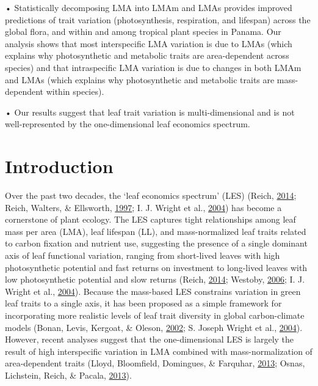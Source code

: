 \documentclass[12pt,]{article}
\theoremstyle{definition}
\theoremstyle{definition}
\theoremstyle{definition}
\theoremstyle{remark}
\begin{document}
• Statistically decomposing LMA into LMAm and LMAs provides improved
predictions of trait variation (photosynthesis, respiration, and
lifespan) across the global flora, and within and among tropical plant
species in Panama. Our analysis shows that most interspecific LMA
variation is due to LMAs (which explains why photosynthetic and
metabolic traits are area-dependent across species) and that
intraspecific LMA variation is due to changes in both LMAm and LMAs
(which explains why photosynthetic and metabolic traits are
mass-dependent within species).

• Our results suggest that leaf trait variation is multi-dimensional and
is not well-represented by the one-dimensional leaf economics spectrum.

\hypertarget{introduction}{%
\section{Introduction}\label{introduction}}

Over the past two decades, the `leaf economics spectrum' (LES) (Reich,
\protect\hyperlink{ref-Reich2014}{2014}; Reich, Walters, \& Ellsworth,
\protect\hyperlink{ref-Reich1997}{1997}; I. J. Wright et al.,
\protect\hyperlink{ref-Wright2004a}{2004}) has become a cornerstone of
plant ecology. The LES captures tight relationships among leaf mass per
area (LMA), leaf lifespan (LL), and mass-normalized leaf traits related
to carbon fixation and nutrient use, suggesting the presence of a single
dominant axis of leaf functional variation, ranging from short-lived
leaves with high photosynthetic potential and fast returns on investment
to long-lived leaves with low photosynthetic potential and slow returns
(Reich, \protect\hyperlink{ref-Reich2014}{2014}; Westoby,
\protect\hyperlink{ref-Westoby2006}{2006}; I. J. Wright et al.,
\protect\hyperlink{ref-Wright2004a}{2004}). Because the mass-based LES
constrains variation in green leaf traits to a single axis, it has been
proposed as a simple framework for incorporating more realistic levels
of leaf trait diversity in global carbon-climate models (Bonan, Levis,
Kergoat, \& Oleson, \protect\hyperlink{ref-Bonan2002}{2002}; S. Joseph
Wright et al., \protect\hyperlink{ref-Wright2004}{2004}). However,
recent analyses suggest that the one-dimensional LES is largely the
result of high interspecific variation in LMA combined with
mass-normalization of area-dependent traits (Lloyd, Bloomfield,
Domingues, \& Farquhar, \protect\hyperlink{ref-Lloyd2013}{2013}; Osnas,
Lichstein, Reich, \& Pacala, \protect\hyperlink{ref-Osnas2013}{2013}).
\end{document}
